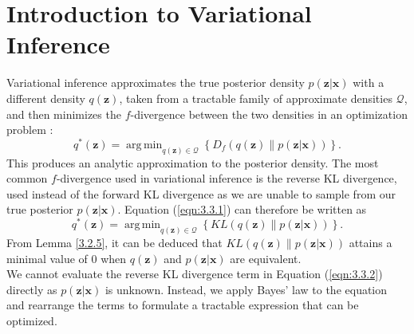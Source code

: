 \documentclass[honours,12pt, twoside]{unswthesis}
\DeclareMathOperator*{\argmin}{arg\,min}
\numberwithin{equation}{section}
\theoremstyle{definition}
\begin{document}
\section{Introduction to Variational Inference}\label{sec:3.3}
Variational inference approximates the true posterior density $p(\bm{z}|\bm{x})$ with a different density $q(\bm{z})$, taken from a tractable family of approximate densities $\mathcal{Q}$, and then minimizes the $f$-divergence between the two densities in an optimization problem \citep{blei}:
\begin{equation}\label{eqn:3.3.1}
q^*(\bm{z})=\argmin_{q(\bm{z})\in \mathcal{Q}}\left\lbrace D_f(q(\bm{z})\|p(\bm{z}|\bm{x}))\right\rbrace.
\end{equation}
This produces an analytic approximation to the posterior density. The most common $f$-divergence used in variational inference is the reverse KL divergence, used instead of the forward KL divergence as we are unable to sample from our true posterior $p(\bm{z}|\bm{x})$. Equation (\ref{eqn:3.3.1}) can therefore be written as
\begin{equation}\label{eqn:3.3.2}
q^*(\bm{z})=\argmin_{q(\bm{z})\in \mathcal{Q}}\left\lbrace KL(q(\bm{z})\|p(\bm{z}|\bm{x}))\right\rbrace.
\end{equation}
From Lemma \ref{3.2.5}, it can be deduced that $KL(q(\bm{z})\|p(\bm{z}|\bm{x}))$ attains a minimal value of $0$ when $q(\bm{z})$ and $p(\bm{z}|\bm{x})$ are equivalent.\\
We cannot evaluate the reverse KL divergence term in Equation (\ref{eqn:3.3.2}) directly as $p(\bm{z}|\bm{x})$ is unknown. Instead, we apply Bayes' law to the equation and rearrange the terms to formulate a tractable expression that can be optimized.
\end{document}
